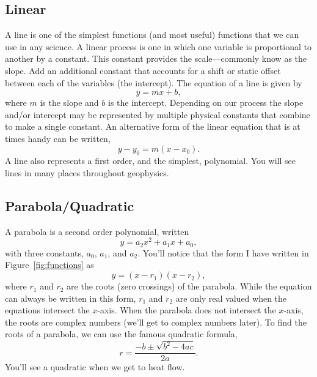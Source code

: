 \documentclass[final,a4paper,12pt]{article}
\theoremstyle{definition}
\begin{document}
\subsection{Linear}
A line is one of the simplest functions (and most useful) functions that we can
use in any science.  A linear process is one in which one variable is
proportional to another by a constant.  This constant provides the
scale---commonly know as the slope.  Add an additional constant that accounts
for a shift or static offset between each of the variables (the intercept).  The
equation of a line is given by
\begin{equation}
    y = m x + b ,
\end{equation}
where $m$ is the slope and $b$ is the intercept.  Depending on our process the
slope and/or intercept may be represented by multiple physical constants that
combine to make a single constant.  An alternative form of the linear equation
that is at times handy can be written,
\begin{equation}
    y - y_0 = m (x - x_0).
\end{equation}
A line also represents a first order, and the simplest, polynomial.  You will
see lines in many places throughout geophysics.

\subsection{Parabola/Quadratic}
A parabola is a second order polynomial, written
\begin{equation}
    y = a_2 x^2 + a_1 x + a_0 ,
\end{equation}
with three constants, $a_0$, $a_1$, and $a_2$.  You'll notice that the form I
have written in Figure~\ref{fig:functions} as
\begin{equation}
    y = (x - r_1)(x - r_2) ,
\end{equation}
where $r_1$ and $r_2$ are the roots (zero crossings) of the parabola.  While the
equation can always be written in this form, $r_1$ and $r_2$ are only real
valued when the equations intersect the $x$-axis.  When the parabola does not
intersect the $x$-axis, the roots are complex numbers (we'll get to complex
numbers later).  To find the roots of a parabola, we can use the famous
quadratic formula,
\begin{equation}
    r = \frac{-b \pm \sqrt{b^2 - 4ac}}{2a} .
\end{equation}
You'll see a quadratic when we get to heat flow.
\end{document}
